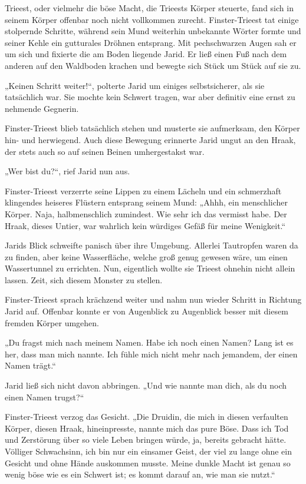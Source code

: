 Trieest, oder vielmehr die böse Macht, die Trieests Körper steuerte, fand sich in seinem Körper offenbar noch nicht vollkommen zurecht. Finster-Trieest tat einige stolpernde Schritte, während sein Mund weiterhin unbekannte Wörter formte und seiner Kehle ein gutturales Dröhnen entsprang. Mit pechschwarzen Augen sah er um sich und fixierte die am Boden liegende Jarid. Er ließ einen Fuß nach dem anderen auf den Waldboden krachen und bewegte sich Stück um Stück auf sie zu.

„Keinen Schritt weiter!“, polterte Jarid um einiges selbstsicherer, als sie tatsächlich war. Sie mochte kein Schwert tragen, war aber definitiv eine ernst zu nehmende Gegnerin.

Finster-Trieest blieb tatsächlich stehen und musterte sie aufmerksam, den Körper hin- und herwiegend. Auch diese Bewegung erinnerte Jarid ungut an den Hraak, der stets auch so auf seinen Beinen umhergestakst war.

„Wer bist du?“, rief Jarid nun aus.

Finster-Trieest verzerrte seine Lippen zu einem Lächeln und ein schmerzhaft klingendes heiseres Flüstern entsprang seinem Mund: „Ahhh, ein menschlicher Körper. Naja, halbmenschlich zumindest. Wie sehr ich das vermisst habe. Der Hraak, dieses Untier, war wahrlich kein würdiges Gefäß für meine Wenigkeit.“

Jarids Blick schweifte panisch über ihre Umgebung. Allerlei Tautropfen waren da zu finden, aber keine Wasserfläche, welche groß genug gewesen wäre, um einen Wassertunnel zu errichten. Nun, eigentlich wollte sie Trieest ohnehin nicht allein lassen. Zeit, sich diesem Monster zu stellen.

Finster-Trieest sprach krächzend weiter und nahm nun wieder Schritt in Richtung Jarid auf. Offenbar konnte er von Augenblick zu Augenblick besser mit diesem fremden Körper umgehen.

„Du fragst mich nach meinem Namen. Habe ich noch einen Namen? Lang ist es her, dass man mich nannte. Ich fühle mich nicht mehr nach jemandem, der einen Namen trägt.“

Jarid ließ sich nicht davon abbringen. „Und wie nannte man dich, als du noch einen Namen trugst?“

Finster-Trieest verzog das Gesicht. „Die Druidin, die mich in diesen verfaulten Körper, diesen Hraak, hineinpresste, nannte mich das pure Böse. Dass ich Tod und Zerstörung über so viele Leben bringen würde, ja, bereits gebracht hätte. Völliger Schwachsinn, ich bin nur ein einsamer Geist, der viel zu lange ohne ein Gesicht und ohne Hände auskommen musste. Meine dunkle Macht ist genau so wenig böse wie es ein Schwert ist; es kommt darauf an, wie man sie nutzt.“


